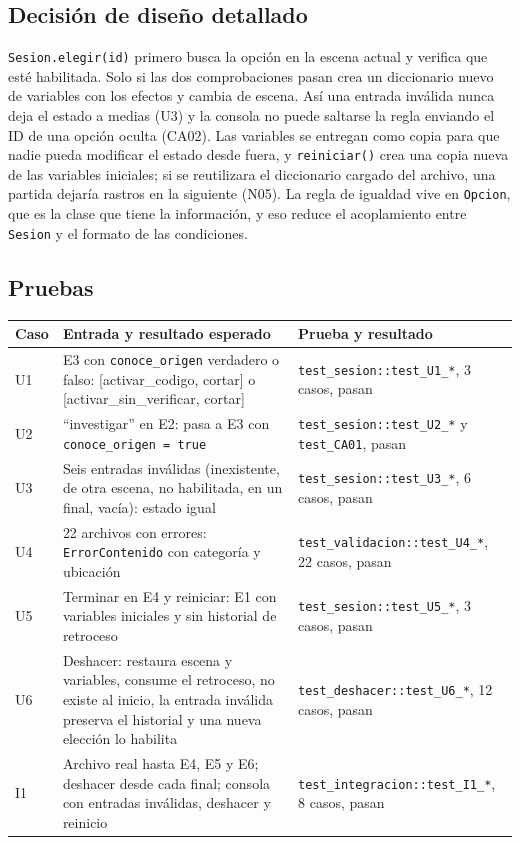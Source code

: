 \documentclass[11pt,letterpaper]{article}
\newcommand{\cod}[1]{\texttt{#1}}
\begin{document}
\subsection{Decisión de diseño detallado}
\cod{Sesion.elegir(id)} primero busca la opción en la escena actual y verifica que esté habilitada. Solo si las dos comprobaciones pasan crea un diccionario nuevo de variables con los efectos y cambia de escena. Así una entrada inválida nunca deja el estado a medias (U3) y la consola no puede saltarse la regla enviando el ID de una opción oculta (CA02). Las variables se entregan como copia para que nadie pueda modificar el estado desde fuera, y \cod{reiniciar()} crea una copia nueva de las variables iniciales; si se reutilizara el diccionario cargado del archivo, una partida dejaría rastros en la siguiente (N05). La regla de igualdad vive en \cod{Opcion}, que es la clase que tiene la información, y eso reduce el acoplamiento entre \cod{Sesion} y el formato de las condiciones.

\subsection{Pruebas}
{\small
\begin{tabularx}{\linewidth}{@{}l>{\raggedright}p{6.4cm}L@{}}
\toprule
Caso & Entrada y resultado esperado & Prueba y resultado\\ \midrule
U1 & E3 con \cod{conoce\_origen} verdadero o falso: [activar\_codigo, cortar] o [activar\_sin\_verificar, cortar] & \cod{test\_sesion::test\_U1\_*}, 3 casos, pasan\\
U2 & ``investigar'' en E2: pasa a E3 con \cod{conoce\_origen = true} & \cod{test\_sesion::test\_U2\_*} y \cod{test\_CA01}, pasan\\
U3 & Seis entradas inválidas (inexistente, de otra escena, no habilitada, en un final, vacía): estado igual & \cod{test\_sesion::test\_U3\_*}, 6 casos, pasan\\
U4 & 22 archivos con errores: \cod{ErrorContenido} con categoría y ubicación & \cod{test\_validacion::test\_U4\_*}, 22 casos, pasan\\
U5 & Terminar en E4 y reiniciar: E1 con variables iniciales y sin historial de retroceso & \cod{test\_sesion::test\_U5\_*}, 3 casos, pasan\\
U6 & Deshacer: restaura escena y variables, consume el retroceso, no existe al inicio, la entrada inválida preserva el historial y una nueva elección lo habilita & \cod{test\_deshacer::test\_U6\_*}, 12 casos, pasan\\
I1 & Archivo real hasta E4, E5 y E6; deshacer desde cada final; consola con entradas inválidas, deshacer y reinicio & \cod{test\_integracion::test\_I1\_*}, 8 casos, pasan\\ \bottomrule
\end{tabularx}}
\end{document}
